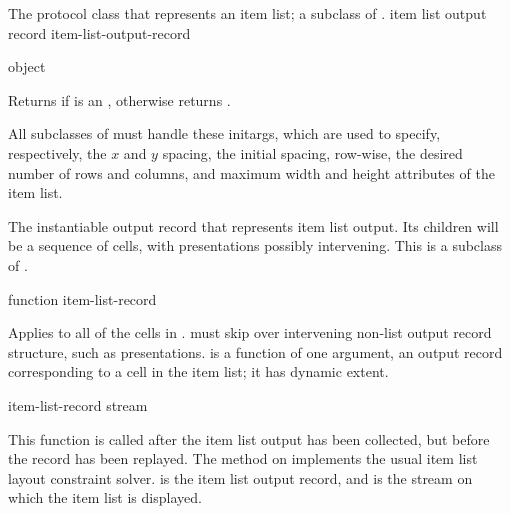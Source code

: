 
The protocol class that represents an item list; a subclass of
.
 {item list output record} {item-list-output-record}

 {object}

Returns  if  is an ,
otherwise returns .


All subclasses of  must handle these initargs, which
are used to specify, respectively, the $x$ and $y$ spacing, the initial spacing,
row-wise, the desired number of rows and columns, and maximum width and height
attributes of the item list.


The instantiable output record that represents item list output.  Its children
will be a sequence of cells, with presentations possibly intervening.  This is a
subclass of .

 {function item-list-record}

Applies  to all of the cells in .
 must skip over intervening non-list output record
structure, such as presentations.   is a function of one argument,
an output record corresponding to a cell in the item list; it has dynamic
extent.

 {item-list-record stream}

This function is called after the item list output has been collected, but
before the record has been replayed.  The method on
 implements the usual item list layout
constraint solver.   is the item list output record, and
 is the stream on which the item list is displayed.

